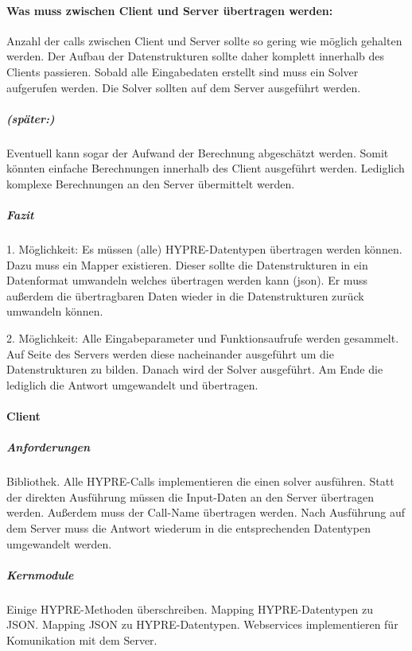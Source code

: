 \documentclass[a4paper,10pt]{article}
\numberwithin{figure}{section}
\numberwithin{table}{section}
\begin{document}

\paragraph{Was muss zwischen Client und Server übertragen werden:}

Anzahl der calls zwischen Client und Server sollte so gering wie möglich gehalten werden.
Der Aufbau der Datenstrukturen sollte daher komplett innerhalb des Clients passieren.
Sobald alle Eingabedaten erstellt sind muss ein Solver aufgerufen werden.
Die Solver sollten auf dem Server ausgeführt werden.

\subparagraph{(später:)}

Eventuell kann sogar der Aufwand der Berechnung abgeschätzt werden.
Somit könnten einfache Berechnungen innerhalb des Client ausgeführt werden.
Lediglich komplexe Berechnungen an den Server übermittelt werden.

\subparagraph{Fazit}

1. Möglichkeit:
Es müssen (alle) HYPRE-Datentypen übertragen werden können.
Dazu muss ein Mapper existieren.
Dieser sollte die Datenstrukturen in ein Datenformat umwandeln welches übertragen werden kann (json).
Er muss außerdem die übertragbaren Daten wieder in die Datenstrukturen zurück umwandeln können.

2. Möglichkeit:
Alle Eingabeparameter und Funktionsaufrufe werden gesammelt.
Auf Seite des Servers werden diese nacheinander ausgeführt um die Datenstrukturen zu bilden.
Danach wird der Solver ausgeführt.
Am Ende die lediglich die Antwort umgewandelt und übertragen.

\paragraph{Client}

\subparagraph{Anforderungen}

Bibliothek.
Alle HYPRE-Calls implementieren die einen solver ausführen.
Statt der direkten Ausführung müssen die Input-Daten an den Server übertragen werden.
Außerdem muss der Call-Name übertragen werden.
Nach Ausführung auf dem Server muss die Antwort wiederum in die entsprechenden Datentypen umgewandelt werden.

\subparagraph{Kernmodule}

Einige HYPRE-Methoden überschreiben.
Mapping HYPRE-Datentypen zu JSON.
Mapping JSON zu HYPRE-Datentypen.
Webservices implementieren für Komunikation mit dem Server.
\end{document}
